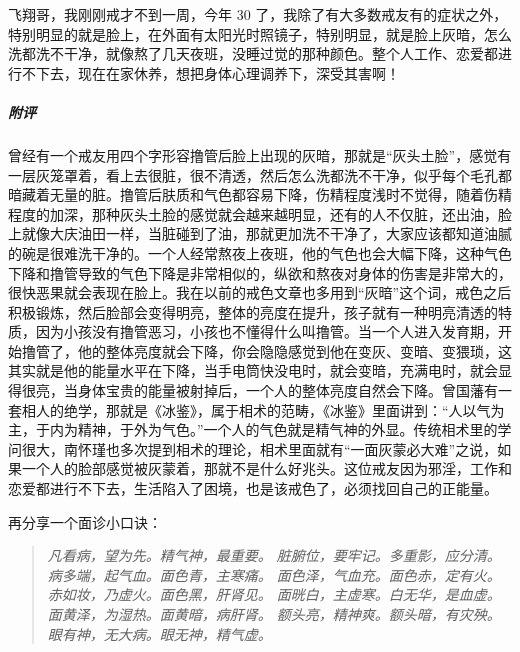 \begin{case}
    飞翔哥，我刚刚戒才不到一周，今年 30 了，我除了有大多数戒友有的症状之外，特别明显的就是脸上，在外面有太阳光时照镜子，特别明显，就是脸上灰暗，怎么洗都洗不干净，就像熬了几天夜班，没睡过觉的那种颜色。整个人工作、恋爱都进行不下去，现在在家休养，想把身体心理调养下，深受其害啊！
    \subparagraph{附评} 曾经有一个戒友用四个字形容撸管后脸上出现的灰暗，那就是“灰头土脸”，感觉有一层灰笼罩着，看上去很脏，很不清透，然后怎么洗都洗不干净，似乎每个毛孔都暗藏着无量的脏。撸管后肤质和气色都容易下降，伤精程度浅时不觉得，随着伤精程度的加深，那种灰头土脸的感觉就会越来越明显，还有的人不仅脏，还出油，脸上就像大庆油田一样，当脏碰到了油，那就更加洗不干净了，大家应该都知道油腻的碗是很难洗干净的。一个人经常熬夜上夜班，他的气色也会大幅下降，这种气色下降和撸管导致的气色下降是非常相似的，纵欲和熬夜对身体的伤害是非常大的，很快恶果就会表现在脸上。我在以前的戒色文章也多用到“灰暗”这个词，戒色之后积极锻炼，然后脸部会变得明亮，整体的亮度在提升，孩子就有一种明亮清透的特质，因为小孩没有撸管恶习，小孩也不懂得什么叫撸管。当一个人进入发育期，开始撸管了，他的整体亮度就会下降，你会隐隐感觉到他在变灰、变暗、变猥琐，这其实就是他的能量水平在下降，当手电筒快没电时，就会变暗，充满电时，就会显得很亮，当身体宝贵的能量被射掉后，一个人的整体亮度自然会下降。曾国藩有一套相人的绝学，那就是《冰鉴》，属于相术的范畴，《冰鉴》里面讲到：“人以气为主，于内为精神，于外为气色。”一个人的气色就是精气神的外显。传统相术里的学问很大，南怀瑾也多次提到相术的理论，相术里面就有“一面灰蒙必大难”之说，如果一个人的脸部感觉被灰蒙着，那就不是什么好兆头。这位戒友因为邪淫，工作和恋爱都进行不下去，生活陷入了困境，也是该戒色了，必须找回自己的正能量。

    再分享一个面诊小口诀：

    \begin{quotation}\it
        凡看病，望为先。精气神，最重要。
        脏腑位，要牢记。多重影，应分清。
        病多端，起气血。面色青，主寒痛。
        面色泽，气血充。面色赤，定有火。
        赤如妆，乃虚火。面色黑，肝肾见。
        面晄白，主虚寒。白无华，是血虚。
        面黄泽，为湿热。面黄暗，病肝肾。
        额头亮，精神爽。额头暗，有灾殃。
        眼有神，无大病。眼无神，精气虚。
    \end{quotation}
\end{case}

